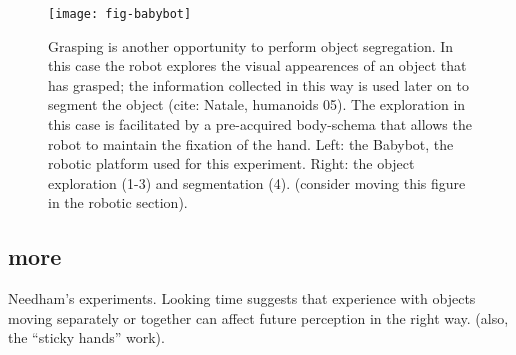 \begin{figure}[t]

\centerline{
\texttt{[image: fig-babybot]}
}

\caption{
%
Grasping is another opportunity to perform object segregation. In this case the robot explores the visual appearences of an object that has grasped; the information collected in this way is used later on to segment the object (cite: Natale, humanoids 05). The exploration in this case is facilitated by a pre-acquired body-schema that allows the robot to maintain the fixation of the hand. Left: the Babybot, the robotic platform used for this experiment. Right: the object exploration (1-3) and segmentation (4). (consider moving this figure in the robotic section). 
%
}

\label{fig:babybot}

\end{figure}

\subsection{more}

Needham's experiments. 
\cite{needham01object,needham97object}
Looking time suggests that experience with objects moving separately
or together can affect future perception in the right way.
(also, the ``sticky hands'' work).
